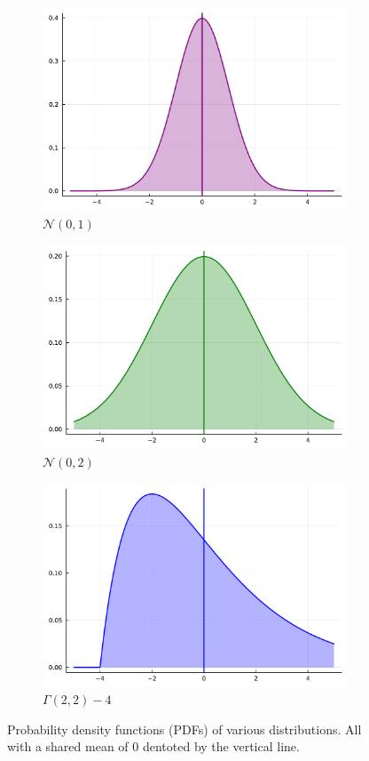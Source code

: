 \documentclass[10pt]{article}
\theoremstyle{plain}
\theoremstyle{remark}
\begin{document}
\begin{figure}[ht!]
        \begin{subfigure}[t]{0.5\textwidth}
                \centering
                \includegraphics[width=0.7\linewidth]{julia_figures/normal.pdf}
                \caption{$\mathcal{N}(0,1)$}\label{fig:normal}
        \end{subfigure}
        \begin{subfigure}[t]{0.5\textwidth}
                \centering
                \includegraphics[width=0.7\linewidth]{julia_figures/normal_wide.pdf}
                \caption{$\mathcal{N}(0,2)$}\label{fig:normal_wide}
        \end{subfigure}
        \begin{subfigure}[t]{1.0\textwidth}
                \centering
                \includegraphics[width=0.4\linewidth]{julia_figures/gamma.pdf}
                \caption{$\Gamma(2,2) - 4$}\label{fig:gamma}
        \end{subfigure}
        \caption{Probability density functions (PDFs) of various distributions. All with a shared mean of 0 dentoted by the vertical line.}\label{fig:pdfs}
\end{figure}
\end{document}
